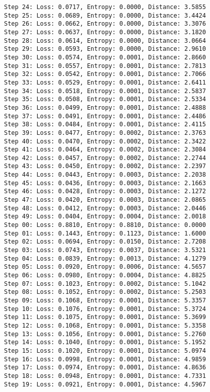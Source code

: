 \documentclass[11pt]{article}
\begin{document}
\begin{Verbatim}[commandchars=\\\{\}]
Step 24: Loss: 0.0717, Entropy: 0.0000, Distance: 3.5855
Step 25: Loss: 0.0689, Entropy: 0.0000, Distance: 3.4424
Step 26: Loss: 0.0662, Entropy: 0.0000, Distance: 3.3076
Step 27: Loss: 0.0637, Entropy: 0.0000, Distance: 3.1820
Step 28: Loss: 0.0614, Entropy: 0.0000, Distance: 3.0664
Step 29: Loss: 0.0593, Entropy: 0.0000, Distance: 2.9610
Step 30: Loss: 0.0574, Entropy: 0.0001, Distance: 2.8660
Step 31: Loss: 0.0557, Entropy: 0.0001, Distance: 2.7813
Step 32: Loss: 0.0542, Entropy: 0.0001, Distance: 2.7066
Step 33: Loss: 0.0529, Entropy: 0.0001, Distance: 2.6411
Step 34: Loss: 0.0518, Entropy: 0.0001, Distance: 2.5837
Step 35: Loss: 0.0508, Entropy: 0.0001, Distance: 2.5334
Step 36: Loss: 0.0499, Entropy: 0.0001, Distance: 2.4888
Step 37: Loss: 0.0491, Entropy: 0.0001, Distance: 2.4486
Step 38: Loss: 0.0484, Entropy: 0.0001, Distance: 2.4115
Step 39: Loss: 0.0477, Entropy: 0.0002, Distance: 2.3763
Step 40: Loss: 0.0470, Entropy: 0.0002, Distance: 2.3422
Step 41: Loss: 0.0464, Entropy: 0.0002, Distance: 2.3084
Step 42: Loss: 0.0457, Entropy: 0.0002, Distance: 2.2744
Step 43: Loss: 0.0450, Entropy: 0.0002, Distance: 2.2397
Step 44: Loss: 0.0443, Entropy: 0.0003, Distance: 2.2038
Step 45: Loss: 0.0436, Entropy: 0.0003, Distance: 2.1663
Step 46: Loss: 0.0428, Entropy: 0.0003, Distance: 2.1272
Step 47: Loss: 0.0420, Entropy: 0.0003, Distance: 2.0865
Step 48: Loss: 0.0412, Entropy: 0.0003, Distance: 2.0446
Step 49: Loss: 0.0404, Entropy: 0.0004, Distance: 2.0018
Step 00: Loss: 0.8810, Entropy: 0.8810, Distance: 0.0000
Step 01: Loss: 0.1443, Entropy: 0.1123, Distance: 1.6000
Step 02: Loss: 0.0694, Entropy: 0.0150, Distance: 2.7208
Step 03: Loss: 0.0743, Entropy: 0.0037, Distance: 3.5321
Step 04: Loss: 0.0839, Entropy: 0.0013, Distance: 4.1279
Step 05: Loss: 0.0920, Entropy: 0.0006, Distance: 4.5657
Step 06: Loss: 0.0980, Entropy: 0.0004, Distance: 4.8825
Step 07: Loss: 0.1023, Entropy: 0.0002, Distance: 5.1042
Step 08: Loss: 0.1052, Entropy: 0.0002, Distance: 5.2503
Step 09: Loss: 0.1068, Entropy: 0.0001, Distance: 5.3357
Step 10: Loss: 0.1076, Entropy: 0.0001, Distance: 5.3724
Step 11: Loss: 0.1075, Entropy: 0.0001, Distance: 5.3699
Step 12: Loss: 0.1068, Entropy: 0.0001, Distance: 5.3358
Step 13: Loss: 0.1056, Entropy: 0.0001, Distance: 5.2760
Step 14: Loss: 0.1040, Entropy: 0.0001, Distance: 5.1952
Step 15: Loss: 0.1020, Entropy: 0.0001, Distance: 5.0974
Step 16: Loss: 0.0998, Entropy: 0.0001, Distance: 4.9859
Step 17: Loss: 0.0974, Entropy: 0.0001, Distance: 4.8636
Step 18: Loss: 0.0948, Entropy: 0.0001, Distance: 4.7331
Step 19: Loss: 0.0921, Entropy: 0.0001, Distance: 4.5967

\end{Verbatim}
\end{document}
